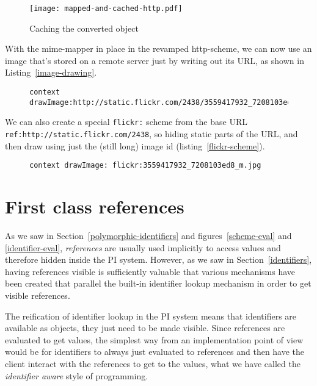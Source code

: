 \documentclass[preprint,authoryear]{llncs}
\begin{document}
\begin{figure}[htbp]
\begin{center}
\texttt{[image: mapped-and-cached-http.pdf]}
\caption{Caching the converted object}
\label{http-converted-cached}
\end{center}
\end{figure}


With the mime-mapper in place in the revamped http-scheme, we can now use 
an image that's stored on a remote server just by writing out its URL, as shown
in Listing~\ref{image-drawing}.

\begin{figure}[htbp]
\begin{lstlisting}[style=L,label=image-drawing,caption=Drawing a remote image via {\tt http:}.]
context drawImage:http://static.flickr.com/2438/3559417932_7208103ed8_m.jpg
\end{lstlisting}
\end{figure}

We can also create a special {\tt flickr:} scheme from the base URL {\tt ref:http://static.flickr.com/2438},
so hiding static parts of the URL,
and then draw using just the (still long) image id (listing~\ref{flickr-scheme}).

\begin{figure}[htbp]
\begin{lstlisting}[style=L,label=flickr-scheme,caption=Drawing remote image via {\tt flickr:}]
context drawImage: flickr:3559417932_7208103ed8_m.jpg
\end{lstlisting}
\end{figure}


\section{First class references}
\label{references}


As we saw in Section~\ref{polymorphic-identifiers} and figures~\ref{scheme-eval} and \ref{identifier-eval}, \emph{references}
are usually used implicitly to access values and therefore hidden inside the PI system.  However,
as we saw in Section~\ref{identifiers}, having references visible is sufficiently valuable that various
mechanisms have been created that parallel the built-in identifier lookup mechanism in order to
get visible references.

The reification of identifier lookup in the PI system means that identifiers are available as objects, 
they just need to be made visible.   Since references are evaluated to get values, the 
simplest way from an implementation point of view would be for identifiers to always just
evaluated to references and then have the client interact with the references to get to
the values, what we have called the \emph{identifier aware} style of programming.
\end{document}
